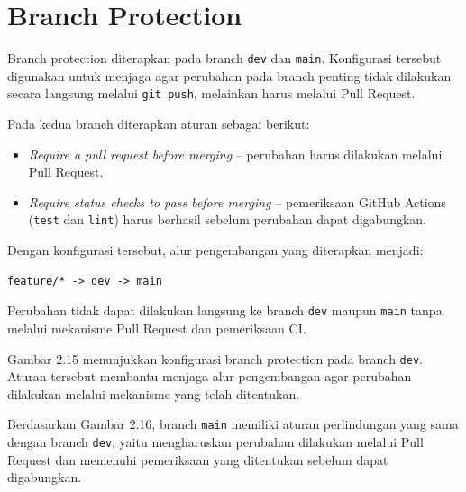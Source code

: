 \documentclass[a4paper,oneside,11pt]{book}
\begin{document}
\section{Branch Protection}

Branch protection diterapkan pada branch \texttt{dev} dan \texttt{main}. Konfigurasi tersebut digunakan untuk menjaga agar perubahan pada branch penting tidak dilakukan secara langsung melalui \texttt{git push}, melainkan harus melalui Pull Request.

Pada kedua branch diterapkan aturan sebagai berikut:
\begin{itemize}
    \item \textit{Require a pull request before merging} -- perubahan harus dilakukan melalui Pull Request.
    \item \textit{Require status checks to pass before merging} -- pemeriksaan GitHub Actions (\texttt{test} dan \texttt{lint}) harus berhasil sebelum perubahan dapat digabungkan.
\end{itemize}

Dengan konfigurasi tersebut, alur pengembangan yang diterapkan menjadi:

\begin{lstlisting}
feature/* -> dev -> main
\end{lstlisting}

Perubahan tidak dapat dilakukan langsung ke branch \texttt{dev} maupun \texttt{main} tanpa melalui mekanisme Pull Request dan pemeriksaan CI.


Gambar 2.15 menunjukkan konfigurasi branch protection pada branch \texttt{dev}. Aturan tersebut membantu menjaga alur pengembangan agar perubahan dilakukan melalui mekanisme yang telah ditentukan.


Berdasarkan Gambar 2.16, branch \texttt{main} memiliki aturan perlindungan yang sama dengan branch \texttt{dev}, yaitu mengharuskan perubahan dilakukan melalui Pull Request dan memenuhi pemeriksaan yang ditentukan sebelum dapat digabungkan.
\end{document}
